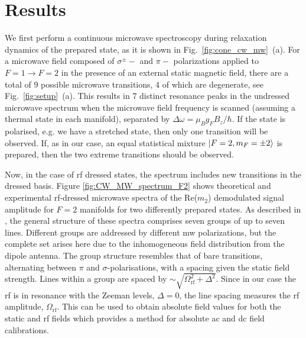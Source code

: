 \documentclass[%
reprint,
 amsmath,amssymb,
 aps,
floatfix,
]{revtex4-1}
\begin{document}

\section{Results \label{Sec:Results}}

We first perform a continuous microwave spectroscopy during relaxation dynamics of the prepared state, as it is shown in Fig.~\ref{fig:cone_cw_mw}~(a).
For a microwave field composed of $\sigma^{\pm}-$ and $\pi-$ polarizations applied to $F=1\rightarrow F=2$ in the presence of an external static magnetic field, there are a total of 9 possible microwave transitions, 4 of which are degenerate, see Fig.~\ref{fig:setup}~(a). This results in 7 distinct resonance peaks in the undressed microwave spectrum when the microwave field frequency is scanned (assuming a thermal state in each manifold), separated by $\Delta\omega=\mu_Bg_FB_z/\hbar$. If the state is polarised, e.g. we have a stretched state, then only one transition will be observed. If, as in our case, an equal statistical mixture $\Ket{F=2,m_F=\pm 2}$ is prepared, then the two extreme transitions should be observed.

Now, in the case of rf dressed states, the spectrum includes new transitions in the dressed basis. %
Figure \ref{fig:CW_MW_spectrum_F2}
shows theoretical and experimental rf-dressed microwave spectra of the Re($m_2$) demodulated signal amplitude for $F=2$ manifolds for two differently prepared states.
As described in \cite{sinuco19}, the general structure of these spectra comprises seven groups of up to seven lines. Different groups are addressed by different mw polarizations, but the complete set arises here due to the inhomogeneous field distribution from the dipole antenna. The group structure resembles that of bare transitions, alternating between $\pi$ and $\sigma$-polarisations, with a spacing given the static field strength. Lines within a group are spaced by $\sim\sqrt{\Omega_{\mathrm{rf}}^2 + \Delta^2}$. Since in our case the rf is in resonance with the Zeeman levels, $\Delta=0$, the line spacing measures the rf amplitude, $\Omega_\mathrm{rf}$. This can be used
to obtain absolute field values for both the static and rf fields which provides a method for absolute ac and dc field calibrations.
\end{document}
